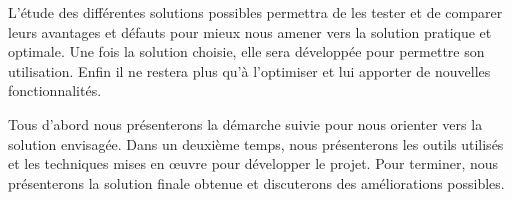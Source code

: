 

L'étude des différentes solutions possibles permettra de les tester et de comparer leurs avantages et défauts pour mieux nous amener vers la solution pratique et optimale.
Une fois la solution choisie, elle sera développée pour permettre son utilisation.
Enfin il ne restera plus qu'à l'optimiser et lui apporter de nouvelles fonctionnalités.


Tous d'abord nous présenterons la démarche suivie pour nous orienter vers la solution envisagée.
Dans un deuxième temps, nous présenterons les outils utilisés et les techniques mises en œuvre pour développer le projet.
Pour terminer, nous présenterons la solution finale obtenue et discuterons des améliorations possibles.
